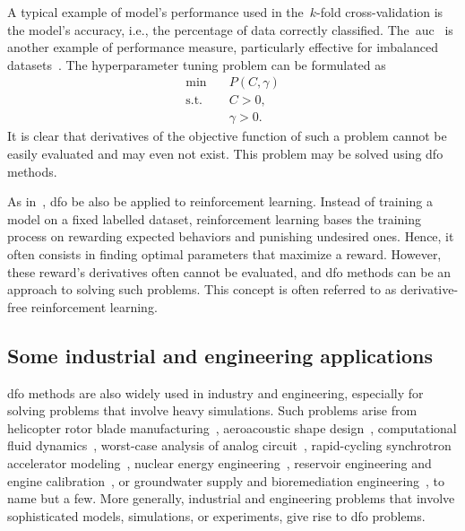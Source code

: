 A typical example of model's performance used in the~$k$-fold cross-validation is the model's accuracy, i.e., the percentage of data correctly classified.
The~\gls{auc}~\cite{Hanley_Mcneil_1982} is another example of performance measure, particularly effective for imbalanced datasets~\cite{Bradley_1997}.
The hyperparameter tuning problem can be formulated as
\begin{equation*}
    \begin{aligned}
        \min        & \quad P(C, \gamma)\\
        \text{s.t.} & \quad C > 0,\\
                    & \quad \gamma > 0.
    \end{aligned}
\end{equation*}
It is clear that derivatives of the objective function of such a problem cannot be easily evaluated and may even not exist.
This problem may be solved using \gls{dfo} methods.

As in~\cite{Qian_Yu_2021}, \gls{dfo} be also be applied to reinforcement learning.
Instead of training a model on a fixed labelled dataset, reinforcement learning bases the training process on rewarding expected behaviors and punishing undesired ones.
Hence, it often consists in finding optimal parameters that maximize a reward.
However, these reward's derivatives often cannot be evaluated, and \gls{dfo} methods can be an approach to solving such problems.
This concept is often referred to as derivative-free reinforcement learning.


\subsection{Some industrial and engineering applications}

\Gls{dfo} methods are also widely used in industry and engineering, especially for solving problems that involve heavy simulations.
Such problems arise from helicopter rotor blade manufacturing~\cite{Booker_Etal_1998a,Booker_Etal_1998b,Serafini_1998}, aeroacoustic shape design~\cite{Marsden_2004,Marsden_Etal_2004}, computational fluid dynamics~\cite{Duvigneau_Visonneau_2004}, worst-case analysis of analog circuit~\cite{Latorre_Etal_2019}, rapid-cycling synchrotron accelerator modeling~\cite{Eldred_Etal_2021}, nuclear energy engineering~\cite{Kortelainen_Etal_2010,Kortelainen_Etal_2012,Kortelainen_Etal_2014}, reservoir engineering and engine calibration~\cite{Langouet_2011}, or groundwater supply and bioremediation engineering~\cite{Fowler_Etal_2008,Mugunthan_Shoemaker_Regis_2005,Yoon_Shoemaker_1999}, to name but a few.
More generally, industrial and engineering problems that involve sophisticated models, simulations, or experiments, give rise to \gls{dfo} problems.

